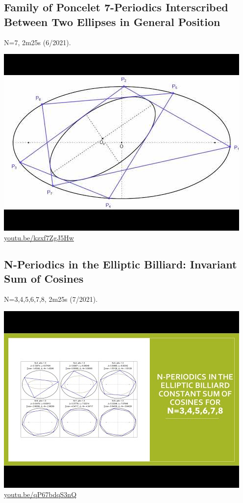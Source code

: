 \documentclass[12pt]{amsart}
\begin{document}
\subsection{Family of Poncelet 7-Periodics Interscribed Between Two Ellipses in General Position}
\label{vid:kzxf7ZgJ5Hw}
\noindent N=7, 2m25s (6/2021). 
\begin{center}\includegraphics[width=.5\textwidth]{pics/kzxf7ZgJ5Hw.jpg} \\ 
\href{https://youtu.be/kzxf7ZgJ5Hw}{\url{youtu.be/kzxf7ZgJ5Hw}}\end{center}
% 

\subsection{N-Periodics in the Elliptic Billiard: Invariant Sum of Cosines}
\label{vid:qP67bdqS3nQ}
\noindent N=3,4,5,6,7,8, 2m25s (7/2021). 
\begin{center}\includegraphics[width=.5\textwidth]{pics/qP67bdqS3nQ.jpg} \\ 
\href{https://youtu.be/qP67bdqS3nQ}{\url{youtu.be/qP67bdqS3nQ}}\end{center}
% 
\end{document}
